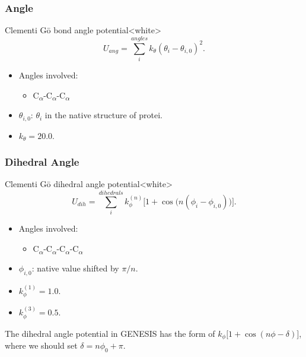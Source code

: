 \subsubsection{Angle}
\label{sec:protein_cc_go_potential_angle}

\begin{smallpage}{Clementi G\={o} bond angle potential}<white>
  \begin{equation}
    \label{eq:protein_cc_go_local_angle}
    U_{ang} = \sum_{i}^{angles} k_\theta (\theta_i - \theta_{i,0})^2.
  \end{equation}
  \tcblower
  \begin{itemize}
  \item Angles involved:
    \begin{itemize}
    \item C\textsubscript{$\alpha$}-C\textsubscript{$\alpha$}-C\textsubscript{$\alpha$}
    \end{itemize}
  \item $\theta_{i, 0}$: $\theta_{i}$ in the native structure of protei.
  \item $k_\theta = 20.0$.
  \end{itemize}
\end{smallpage}


\subsubsection{Dihedral Angle}
\label{sec:protein_cc_go_potential_dihedral_angle}

\begin{smallpage}{Clementi G\={o} dihedral angle potential}<white>
  \begin{equation}
    \label{eq:protein_cc_go_local_dihedral_angle}
    U_{dih} = \sum_{i}^{dihedrals} k_{\phi}^{(n)} \big[ 1+\cos\big(n( \phi_i - \phi_{ i,0 } )\big) \big].
  \end{equation}
  \tcblower
  \begin{itemize}
  \item Angles involved:
    \begin{itemize}
    \item C\textsubscript{$\alpha$}-C\textsubscript{$\alpha$}-C\textsubscript{$\alpha$}-C\textsubscript{$\alpha$}
    \end{itemize}
  \item $\phi_{i, 0}$: native value shifted by $\pi/n$.
  \item $k_\phi^{(1)} = 1.0$.
  \item $k_\phi^{(3)} = 0.5$.
  \end{itemize}
\end{smallpage}

\note{} The dihedral angle potential in GENESIS has the form of $k_{\phi} \big[
1+\cos(n\phi - \delta)\big]$, where we should set $\delta = n\phi_0 + \pi$.

